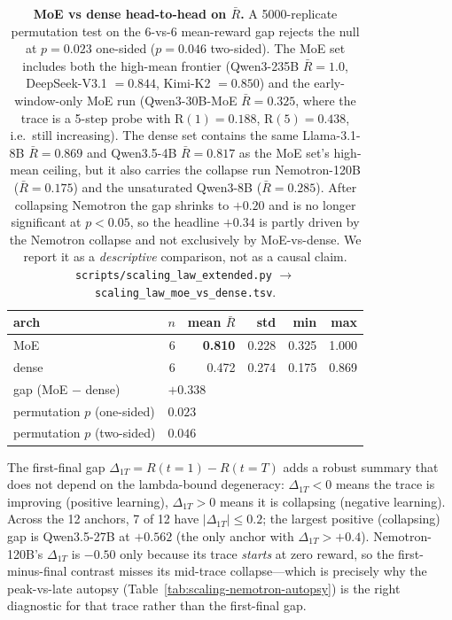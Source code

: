 \documentclass{article}
\providecommand{\tableref}[1]{Table~\ref{#1}}
\begin{document}
\begin{table}[t]
  \centering
  \small
  \begin{tabular}{lrrrrr}
    \toprule
    arch & $n$ & mean $\bar R$ & std & min & max \\
    \midrule
    MoE    & 6 & \textbf{0.810} & 0.228 & 0.325 & 1.000 \\
    dense  & 6 & 0.472           & 0.274 & 0.175 & 0.869 \\
    \midrule
    gap (MoE $-$ dense)        & \multicolumn{5}{l}{$+0.338$} \\
    permutation $p$ (one-sided) & \multicolumn{5}{l}{$\mathbf{0.023}$} \\
    permutation $p$ (two-sided) & \multicolumn{5}{l}{$0.046$} \\
    \bottomrule
  \end{tabular}
  \caption{\textbf{MoE vs dense head-to-head on $\bar R$.}
    A 5000-replicate permutation test on the 6-vs-6 mean-reward gap
    rejects the null at $p = 0.023$ one-sided ($p = 0.046$
    two-sided).  The MoE set includes both the high-mean frontier
    (Qwen3-235B $\bar R = 1.0$, DeepSeek-V3.1 $= 0.844$, Kimi-K2
    $= 0.850$) and the early-window-only MoE run
    (Qwen3-30B-MoE $\bar R = 0.325$, where the trace is a 5-step
    probe with R$(1) = 0.188$, R$(5) = 0.438$, i.e.\ still
    increasing).  The dense set contains the same Llama-3.1-8B
    $\bar R = 0.869$ and Qwen3.5-4B $\bar R = 0.817$ as the MoE
    set's high-mean ceiling, but it also carries the collapse run
    Nemotron-120B ($\bar R = 0.175$) and the unsaturated
    Qwen3-8B ($\bar R = 0.285$).  After collapsing Nemotron the gap
    shrinks to $+0.20$ and is no longer significant at $p < 0.05$,
    so the headline $+0.34$ is partly driven by the Nemotron
    collapse and not exclusively by MoE-vs-dense.  We report it
    as a \emph{descriptive} comparison, not as a causal claim.
    \texttt{scripts/scaling\_law\_extended.py}
    $\to$ \texttt{scaling\_law\_moe\_vs\_dense.tsv}.}
  \label{tab:scaling-moe-vs-dense}
\end{table}

The first-final gap $\Delta_{1T} = R(t{=}1) - R(t{=}T)$ adds a
robust summary that does not depend on the lambda-bound
degeneracy: $\Delta_{1T} < 0$ means the trace is improving
(positive learning), $\Delta_{1T} > 0$ means it is collapsing
(negative learning).  Across the 12 anchors, 7 of 12 have
$|\Delta_{1T}| \le 0.2$; the largest positive (collapsing) gap is
Qwen3.5-27B at $+0.562$ (the only anchor with $\Delta_{1T} > +0.4$).
Nemotron-120B's $\Delta_{1T}$ is $-0.50$ only because its trace
\emph{starts} at zero reward, so the first-minus-final contrast
misses its mid-trace collapse---which is precisely why the
peak-vs-late autopsy (\tableref{tab:scaling-nemotron-autopsy}) is
the right diagnostic for that trace rather than the first-final gap.
\end{document}
